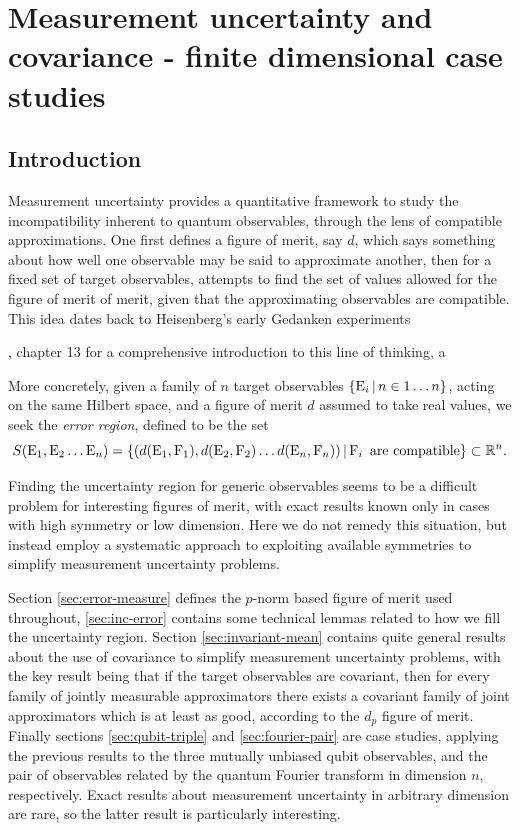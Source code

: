 
\chapter{Measurement uncertainty and covariance - finite dimensional case studies}
\label{chap:cov-meas-ur}
\section{Introduction}
Measurement uncertainty provides a quantitative framework to study the incompatibility inherent to quantum observables, through the lens of compatible approximations. One first defines a figure of merit, say $d$, which says something about how well one observable may be said to approximate another, then for a fixed set of target observables, attempts to find the set of values allowed for the figure of merit of merit, given that the approximating observables are compatible. This idea dates back to Heisenberg's early Gedanken experiments \cite{Heisenberg1927-Wheeler+Zurek}

 \cite{quantum-measurement-busch-et-al}, chapter 13 for a comprehensive introduction to this line of thinking, a 


More concretely, given a family of $n$ target observables $\left\{\operatorname{E}_i\,\middle|\,n\in1\hdots n\right\}$, acting on the same Hilbert space, and a figure of merit $d$ assumed to take real values, we seek the \emph{error region}, defined to be the set
\begin{equation}
  S(\operatorname{E}_1, \operatorname{E}_2\hdots \operatorname{E}_n) = \left\{(d(\operatorname{E}_1, \operatorname{F}_1), d(\operatorname{E}_2, \operatorname{F}_2)\hdots d(\operatorname{E}_n, \operatorname{F}_n))\,\middle|\,\operatorname{F}_i \text{ are compatible}\right\}\subset \mathbb{R}^n.
  \label{eqn:general-ur-definition}
\end{equation}

Finding the uncertainty region for generic observables seems to be a difficult problem for interesting figures of merit, with exact results known only in cases with high symmetry or low dimension\cite{yu-oh-qubit}\cite{dsw-meas-ur-ang-mom}. Here we do not remedy this situation, but instead employ a systematic approach to exploiting available symmetries to simplify measurement uncertainty problems. 

Section \ref{sec:error-measure} defines the $p$-norm based figure of merit used throughout, \ref{sec:inc-error} contains some technical lemmas related to how we fill the uncertainty region. Section \ref{sec:invariant-mean} contains quite general results about the use of covariance to simplify measurement uncertainty problems, with the key result being that if the target observables are covariant, then for every family of jointly measurable approximators there exists a covariant family of joint approximators which is at least as good, according to the $d_p$ figure of merit. Finally sections \ref{sec:qubit-triple} and \ref{sec:fourier-pair} are case studies, applying the previous results to the three mutually unbiased qubit observables, and the pair of observables related by the quantum Fourier transform in dimension $n$, respectively. Exact results about measurement uncertainty in arbitrary dimension are rare, so the latter result is particularly interesting.

